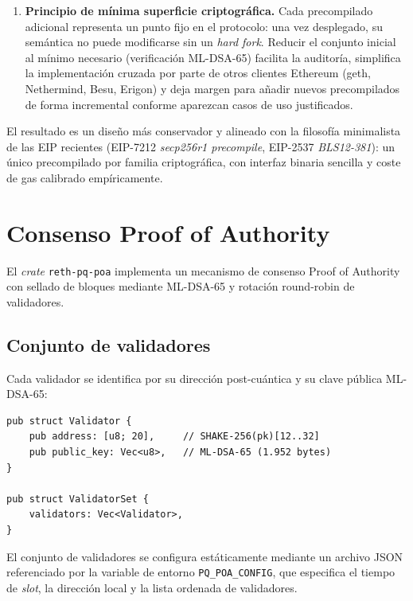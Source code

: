 \begin{enumerate}
  \item \textbf{Principio de mínima superficie criptográfica.} Cada precompilado adicional representa un punto fijo en el protocolo: una vez desplegado, su semántica no puede modificarse sin un \emph{hard fork}. Reducir el conjunto inicial al mínimo necesario (verificación ML-DSA-65) facilita la auditoría, simplifica la implementación cruzada por parte de otros clientes Ethereum (geth, Nethermind, Besu, Erigon) y deja margen para añadir nuevos precompilados de forma incremental conforme aparezcan casos de uso justificados.
\end{enumerate}

El resultado es un diseño más conservador y alineado con la filosofía minimalista de las EIP recientes (EIP-7212 \emph{secp256r1 precompile}, EIP-2537 \emph{BLS12-381}): un único precompilado por familia criptográfica, con interfaz binaria sencilla y coste de gas calibrado empíricamente.


\section{Consenso Proof of Authority}
\label{sec:dev_poa}

El \emph{crate} \texttt{reth-pq-poa} implementa un mecanismo de consenso Proof of Authority con sellado de bloques mediante ML-DSA-65 y rotación round-robin de validadores.

\subsection{Conjunto de validadores}

Cada validador se identifica por su dirección post-cuántica y su clave pública ML-DSA-65:

\begin{lstlisting}[style=rustcode, caption={Estructura del conjunto de validadores.}, label={lst:validator_set}]
pub struct Validator {
    pub address: [u8; 20],     // SHAKE-256(pk)[12..32]
    pub public_key: Vec<u8>,   // ML-DSA-65 (1.952 bytes)
}

pub struct ValidatorSet {
    validators: Vec<Validator>,
}
\end{lstlisting}

El conjunto de validadores se configura estáticamente mediante un archivo JSON referenciado por la variable de entorno \texttt{PQ\_POA\_CONFIG}, que especifica el tiempo de \emph{slot}, la dirección local y la lista ordenada de validadores.

